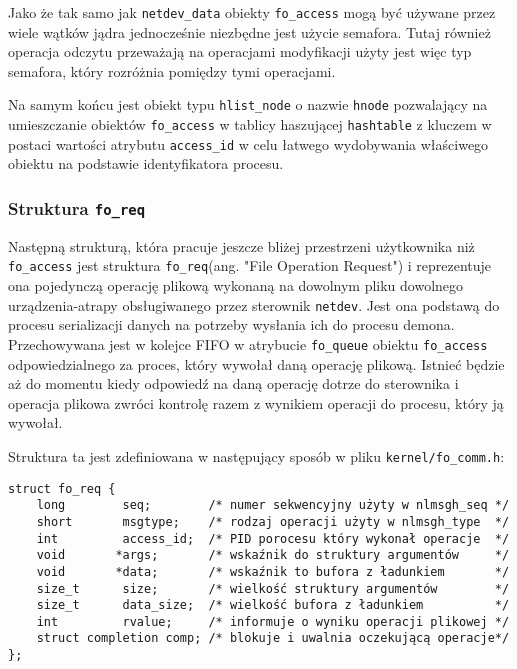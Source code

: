 \documentclass[10pt]{article}
\begin{document}
Jako że tak samo jak \texttt{netdev\_data} obiekty \texttt{fo\_access} mogą być używane przez wiele wątków jądra jednocześnie niezbędne jest użycie semafora. Tutaj również operacja odczytu przeważają na operacjami modyfikacji użyty jest więc typ semafora, który rozróżnia pomiędzy tymi operacjami.

Na samym końcu jest obiekt typu \texttt{hlist\_node} o nazwie \texttt{hnode} pozwalający na umieszczanie obiektów \texttt{fo\_access} w tablicy haszującej \texttt{hashtable} z kluczem w postaci wartości atrybutu \texttt{access\_id} w celu łatwego wydobywania właściwego obiektu na podstawie identyfikatora procesu.

\subsubsection{Struktura \texttt{\large{fo\_req}}}

Następną strukturą, która pracuje jeszcze bliżej przestrzeni użytkownika niż \texttt{fo\_access} jest struktura \texttt{fo\_req}(ang. "File Operation Request") i reprezentuje ona pojedynczą operację plikową wykonaną na dowolnym pliku dowolnego urządzenia-atrapy obsługiwanego przez sterownik \texttt{netdev}. Jest ona podstawą do procesu serializacji danych na potrzeby wysłania ich do procesu demona.  Przechowywana jest w kolejce FIFO w atrybucie \texttt{fo\_queue} obiektu \texttt{fo\_access} odpowiedzialnego za proces, który wywołał daną operację plikową. Istnieć będzie aż do momentu kiedy odpowiedź na daną operację dotrze do sterownika i operacja plikowa zwróci kontrolę razem z wynikiem operacji do procesu, który ją wywołał.

Struktura ta jest zdefiniowana w następujący sposób w pliku \texttt{kernel/fo\_comm.h}:

\begin{verbatim}
struct fo_req {
    long        seq;        /* numer sekwencyjny użyty w nlmsgh_seq */
    short       msgtype;    /* rodzaj operacji użyty w nlmsgh_type  */
    int         access_id;  /* PID porocesu który wykonał operacje  */
    void       *args;       /* wskaźnik do struktury argumentów     */
    void       *data;       /* wskaźnik to bufora z ładunkiem       */
    size_t      size;       /* wielkość struktury argumentów        */
    size_t      data_size;  /* wielkość bufora z ładunkiem          */
    int         rvalue;     /* informuje o wyniku operacji plikowej */
    struct completion comp; /* blokuje i uwalnia oczekującą operacje*/
};
\end{verbatim}
\end{document}

